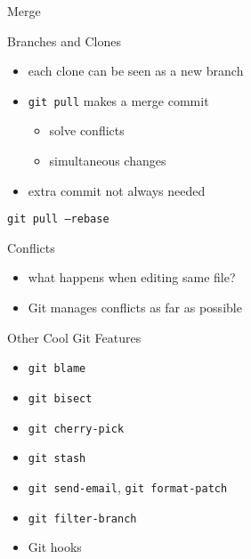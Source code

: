 \documentclass{beamer}
\begin{document}
\begin{frame}{Merge}
  \begin{center}
  \end{center}
\end{frame}

\begin{frame}{Branches and Clones}
  \begin{itemize}
    \item each clone can be seen as a new branch
    \item \texttt{git pull} makes a merge commit
      \begin{itemize}
        \item solve conflicts
        \item simultaneous changes
      \end{itemize}
    \item extra commit not always needed
  \end{itemize}
\end{frame}

\begin{frame}{\texttt{git pull --rebase}}
  \begin{center}
  \end{center}
\end{frame}

\begin{frame}{Conflicts}
  \begin{itemize}
    \item what happens when editing same file?
    \pause
    \item Git manages conflicts as far as possible
  \end{itemize}
\end{frame}

\begin{frame}{Other Cool Git Features}
  \begin{itemize}
    \item \texttt{git blame}
    \item \texttt{git bisect}
    \item \texttt{git cherry-pick}
    \item \texttt{git stash}
    \item \texttt{git send-email}, \texttt{git format-patch}
    \item \texttt{git filter-branch}
    \item Git hooks
  \end{itemize}
\end{frame}
\end{document}
